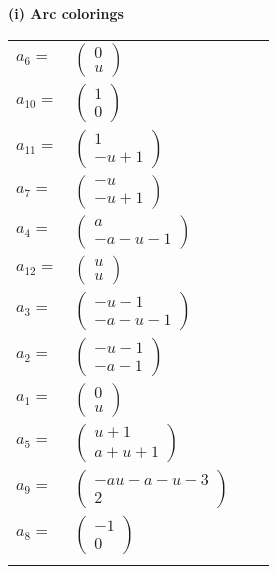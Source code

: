 \documentclass[1p]{elsarticle_modified}
\theoremstyle{definition}
\begin{document}
\flushleft \textbf{(i) Arc colorings}\\
\begin{tabular}{m{7pt} m{180pt} m{7pt} m{180pt} }
\flushright $a_{6}=$&$\begin{pmatrix}0\\u\end{pmatrix}$ \\
\flushright $a_{10}=$&$\begin{pmatrix}1\\0\end{pmatrix}$ \\
\flushright $a_{11}=$&$\begin{pmatrix}1\\- u+1\end{pmatrix}$ \\
\flushright $a_{7}=$&$\begin{pmatrix}- u\\- u+1\end{pmatrix}$ \\
\flushright $a_{4}=$&$\begin{pmatrix}a\\- a- u-1\end{pmatrix}$ \\
\flushright $a_{12}=$&$\begin{pmatrix}u\\u\end{pmatrix}$ \\
\flushright $a_{3}=$&$\begin{pmatrix}- u-1\\- a- u-1\end{pmatrix}$ \\
\flushright $a_{2}=$&$\begin{pmatrix}- u-1\\- a-1\end{pmatrix}$ \\
\flushright $a_{1}=$&$\begin{pmatrix}0\\u\end{pmatrix}$ \\
\flushright $a_{5}=$&$\begin{pmatrix}u+1\\a+u+1\end{pmatrix}$ \\
\flushright $a_{9}=$&$\begin{pmatrix}- a u- a- u-3\\2\end{pmatrix}$ \\
\flushright $a_{8}=$&$\begin{pmatrix}-1\\0\end{pmatrix}$\\&\end{tabular}
\end{document}

